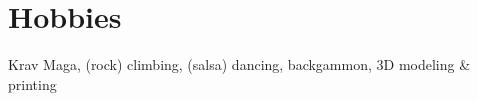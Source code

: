 \section*{Hobbies}
	
	Krav Maga, (rock) climbing, (salsa) dancing, backgammon, 3D modeling \& printing
